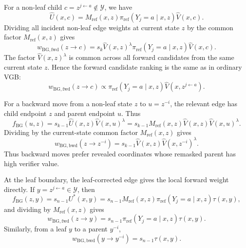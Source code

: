 \documentclass{article}
\numberwithin{theorem}{section}
\numberwithin{proposition}{section}
\numberwithin{corollary}{section}
\numberwithin{lemma}{section}
\numberwithin{conjecture}{section}
\numberwithin{remark}{section}
\numberwithin{definition}{section}
\numberwithin{assumption}{section}
\numberwithin{example}{section}
\newcommand{\calY}{{\mathcal{Y}}}
\providecommand{\base}{\pi_{\mathrm{ref}}}
\begin{document}
For a non-leaf child $c=z^{j\leftarrow a}\notin\calY$, we have
\begin{equation*}
    \widehat U(x,c)=M_{\mathrm{ref}}(x,z)\base(Y_j=a\mid x,z)\widehat V(x,c).
\end{equation*}
Dividing all incident non-leaf edge weights at current state $z$ by the common factor $M_{\mathrm{ref}}(x,z)$ gives
\begin{equation*}
\label{eq:bg_aoar_clean_forward_weight}
    w_{\mathrm{BG,fwd}}(z\to c)
    =
    s_k\widehat V(x,z)^\lambda\base(Y_j=a\mid x,z)\widehat V(x,c).
\end{equation*}
The factor $\widehat V(x,z)^\lambda$ is common across all forward candidates from the same current state $z$. Hence the forward candidate ranking is the same as in ordinary VGB:
\begin{equation*}
    w_{\mathrm{BG,fwd}}(z\to c) \propto \base(Y_j=a\mid x,z)\widehat V(x,z^{j\leftarrow a}).
\end{equation*}

For a backward move from a non-leaf state $z$ to $u=z^{-i}$, the relevant edge has child endpoint $z$ and parent endpoint $u$. Thus
\begin{equation*}
    f_{\mathrm{BG}}(u,z)=s_{k-1}\widehat U(x,z)\widehat V(x,u)^\lambda=
    s_{k-1}M_{\mathrm{ref}}(x,z)\widehat V(x,z)\widehat V(x,u)^\lambda.
\end{equation*}
Dividing by the current-state common factor $M_{\mathrm{ref}}(x,z)$ gives
\begin{equation*}
\label{eq:bg_aoar_clean_backward_weight}
    w_{\mathrm{BG,bwd}}(z\to z^{-i})
    =
    s_{k-1}\widehat V(x,z)\widehat V(x,z^{-i})^\lambda.
\end{equation*}
Thus backward moves prefer revealed coordinates whose remasked parent has high verifier value.

At the leaf boundary, the leaf-corrected edge gives the local forward weight directly. If $y=z^{j\leftarrow a}\in\calY$, then
\begin{equation*}
    f_{\mathrm{BG}}(z,y)=s_{n-1}U^*(x,y)
    =s_{n-1}M_{\mathrm{ref}}(x,z)\base(Y_j=a\mid x,z)\tau(x,y),
\end{equation*}
and dividing by $M_{\mathrm{ref}}(x,z)$ gives
\begin{equation*}
\label{eq:bg_aoar_clean_leaf_forward}
    w_{\mathrm{BG,fwd}}(z\to y)=s_{n-1}\base(Y_j=a\mid x,z)\tau(x,y).
\end{equation*}
Similarly, from a leaf $y$ to a parent $y^{-i}$,
\begin{equation*}
\label{eq:bg_aoar_clean_leaf_backward}
    w_{\mathrm{BG,bwd}}(y\to y^{-i})=s_{n-1}\tau(x,y).
\end{equation*}
\end{document}
